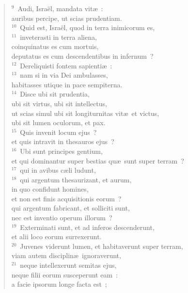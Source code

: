 \begin{flushleft}\begin{verse}${}^{9}$~Audi, Isra\"el, mandata vit\ae~:\\ auribus percipe, ut scias prudentiam.\\
${}^{10}$~Quid est, Isra\"el, quod in terra inimicorum es,\\
${}^{11}$~inveterasti in terra aliena,\\ coinquinatus es cum mortuis,\\ deputatus es cum descendentibus in infernum~?\\
${}^{12}$~Dereliquisti fontem sapienti\ae~:\\
${}^{13}$~nam si in via Dei ambulasses,\\ habitasses utique in pace sempiterna.\\
${}^{14}$~Disce ubi sit prudentia,\\ ubi sit virtus, ubi sit intellectus,\\ ut scias simul ubi sit longiturnitas vit\ae\ et victus,\\ ubi sit lumen oculorum, et pax.\\
${}^{15}$~Quis invenit locum ejus~?\\ et quis intravit in thesauros ejus~?\\
${}^{16}$~Ubi sunt principes gentium,\\ et qui dominantur super bestias qu\ae\ sunt super terram~?\\
${}^{17}$~qui in avibus c\ae li ludunt,\\
${}^{18}$~qui argentum thesaurizant, et aurum,\\ in quo confidunt homines,\\ et non est finis acquisitionis eorum~?\\ qui argentum fabricant, et solliciti sunt,\\ nec est inventio operum illorum~?\\
${}^{19}$~Exterminati sunt, et ad inferos descenderunt,\\ et alii loco eorum surrexerunt.\\
${}^{20}$~Juvenes viderunt lumen, et habitaverunt super terram,\\ viam autem disciplin\ae\ ignoraverunt,\\
${}^{21}$~neque intellexerunt semitas ejus,\\ neque filii eorum susceperunt eam~:\\ a facie ipsorum longe facta est~;\\

\end{verse}
\end{flushleft}
